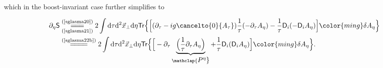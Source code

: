 \begin{note}
\begin{align*}
\end{align*}
which in the boost-invariant case further simplifies to
\begin{fullwidth}
\begin{align*}
    \partial_\eta\textsf{S}&\underset{(\text{\cref{sglasma21}})}{\stackrel{(\text{\cref{sglasma20}})}{=\joinrel=\joinrel=}}2\int\mathrm{d}\tau\mathrm{d}^2\vec{x}_\perp\mathrm{d}\eta\textsf{Tr}\Big\{\Big[(\partial_\tau-ig\cancelto{0}{A_\tau})\frac{1}{\tau}(-\partial_\tau A_\eta)-\frac{1}{\tau}\textsf{D}_i(-\textsf{D}_iA_\eta)\Big]{\color{ming}\delta A_\eta}\Big\}\\
    &\stackrel{(\text{\cref{sglasma22b}})}{=\joinrel=\joinrel=\joinrel=}2\int\mathrm{d}\tau\mathrm{d}^2\vec{x}_\perp\mathrm{d}\eta\textsf{Tr}\Big\{\Big[-\partial_\tau\underbrace{\Big(\frac{1}{\tau}\partial_\tau A_\eta\Big)}_{\mathclap{\textstyle  P^\eta}}+\frac{1}{\tau}\textsf{D}_i(\textsf{D}_iA_\eta)\Big]{\color{ming}\delta A_\eta}\Big\}.
\end{align*}
\end{fullwidth}
\end{note}

